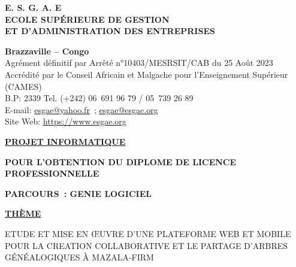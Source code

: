\begin{titlepage}
  \begin{center}

    \large {
      \textbf{
        E. S. G. A. E \\
        ECOLE SUPÉRIEURE DE GESTION \\
        ET D’ADMINISTRATION DES ENTREPRISES \\
      }
    }

    \vspace{0.2cm}

    \large {
      \textbf{ Brazzaville – Congo } \\
      Agrément définitif par Arrêté n°10403/MESRSIT/CAB du 25 Août 2023 \\
      Accrédité par le Conseil Africain et Malgache pour l’Enseignement Supérieur (CAMES) \\
      B.P: 2339 Tel. (+242) 06 691 96 79 / 05 739 26 89 \\
      E-mail: \href{mailto:esgae@yahoo.fr}{esgae@yahoo.fr} ; \href{mailto:esgae@esgae.org}{esgae@esgae.org} \\
      Site Web: \url {https://www.esgae.org} \\
    }

    \vspace{0.5cm}

    \dotfill

    \vspace{0.5cm}

    \large {
      \textbf { \underline {PROJET INFORMATIQUE} }
    }

    \vspace{0.2cm}
    \large {
      \textbf{POUR L’OBTENTION DU DIPLOME DE LICENCE PROFESSIONNELLE}
    }

    \vspace{0.2cm}
    \large {
      \textbf{PARCOURS : GENIE LOGICIEL}
    }

    \vspace{1.5cm}

    \normalsize {
    \textbf { \underline {THÈME} }
    }

    \begin{tcolorbox}[sharp corners=uphill,
    arc=6mm,boxrule=2mm,boxsep=5mm,
    ]
    \centering
    \large {
      ETUDE ET MISE EN ŒUVRE D’UNE PLATEFORME WEB ET MOBILE POUR LA CREATION
      COLLABORATIVE ET LE PARTAGE D’ARBRES GÉNÉALOGIQUES À MAZALA-FIRM
    }
    \end{tcolorbox}
  \end{center}


\end{titlepage}
